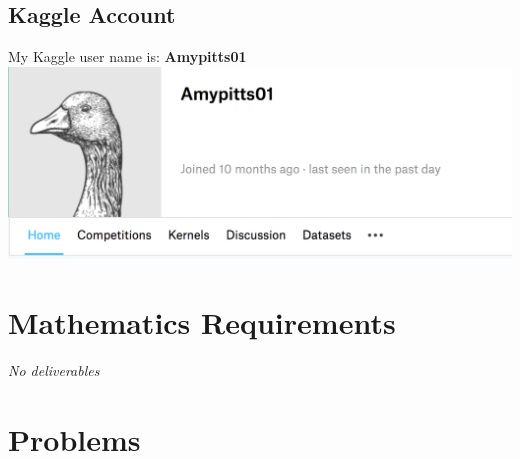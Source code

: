 \documentclass[a4paper]{article}
\begin{document}
\subsection{Kaggle Account}
My Kaggle user name is: \textbf{Amypitts01} \\
\includegraphics[width=.9\textwidth]{kaggle_proof}

\section{Mathematics Requirements}
\textit{No deliverables}

\section{Problems}
\end{document}
